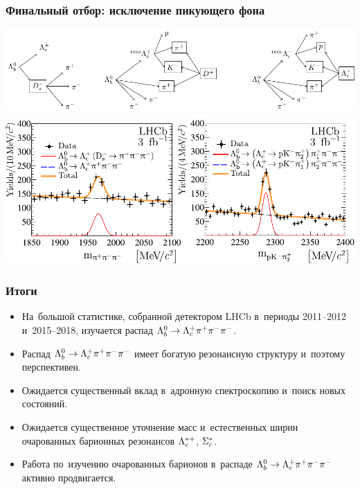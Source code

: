 \documentclass[10pt]{beamer}
\def\bottomleft#1#2{\phantom{#1}\hfill#2\hfill#1}
\begin{document}
\begin{frame}[label=vetoes]%
  \frametitle{Финальный отбор: исключение пикующего фона}
  \centering
  \includegraphics[width=\linewidth]{figures/veto-diagram}
  \\\vfill
  \bottomleft{\rotatebox{90}{[JHEP 03 (2022) 153]}}{
    \includegraphics[width=.8\linewidth]{figures/veto-Ds-Lc-fromnote}
  }
\end{frame}%

\begin{frame}[label=conclusion]%
  \frametitle{Итоги}

  \begin{itemize}
    \item На~большой статистике, собранной детектором LHCb в~периоды 
      2011--2012 и~2015--2018, изучается распад ${\Lambda_b^0}\to{\Lambda_c^+}{\pi^+}{\pi^-}{\pi^-}$.
    \item Распад ${\Lambda_b^0}\to{\Lambda_c^+}{\pi^+}{\pi^-}{\pi^-}$ имеет богатую резонансную 
      структуру и~поэтому перспективен.
    \item Ожидается существенный вклад в~адронную спектроскопию и~поиск 
      новых состояний.
    \item Ожидается существенное уточнение масс и~естественных ширин 
      очарованных барионных резонансов ${\Lambda_c^{*+}}$, ${\Sigma_c^*}$.
    \item Работа по~изучению очарованных барионов в~распаде 
      ${\Lambda_b^0}\to{\Lambda_c^+}{\pi^+}{\pi^-}{\pi^-}$ активно продвигается.
  \end{itemize}
\end{frame}%
\end{document}

